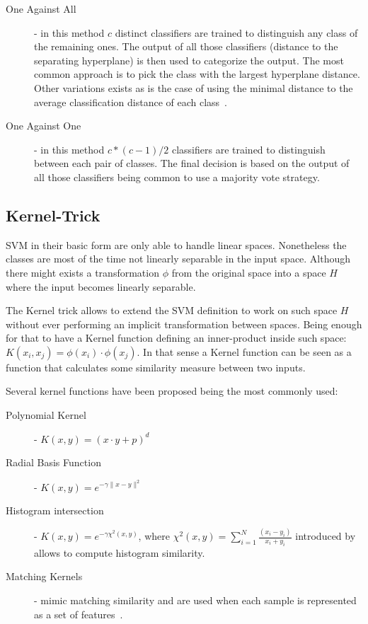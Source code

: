 \begin{description}
\item[One Against All] - in this method $c$ distinct classifiers are trained to
distinguish any class of the remaining ones. The output of all those classifiers
(distance to the separating hyperplane) is then used to categorize the output.
The most common approach is to pick the class with the largest hyperplane
distance. Other variations exists as is the case of using the minimal distance
to the average classification distance of each class~\citep{pronobis2007confidence}.

\item[One Against One] - in this method $c*(c-1)/2$ classifiers are trained to
distinguish between each pair of classes. The final decision is based on the
output of all those classifiers being common to use a majority vote strategy.
\end{description}

\subsection{Kernel-Trick}
\label{sec:kernel-trick}
\gls{SVM} in their basic form are only able to handle linear spaces.
Nonetheless the classes are most of the time not linearly separable in the input
space. Although there might exists a transformation $\phi$ from the original
space into a space $H$ where the input becomes linearly separable.

The Kernel trick allows to extend the \gls{SVM} definition to work on such space
$H$ without ever performing an implicit transformation between spaces. Being
enough for that to have a Kernel function defining an inner-product inside such
space: $K(x_i, x_j) = \phi(x_i)\cdot\phi(x_j)$.
In that sense a Kernel function can be seen as a function that calculates some
similarity measure between two inputs.

Several kernel functions have been proposed being the most commonly used:

\begin{description}
\item[Polynomial Kernel] - $K(x, y) = (x \cdot y + p)^d$
\item[Radial Basis Function] - $K(x, y) = e^{-\gamma\|x - y \|^2}$
\item[Histogram intersection] - $K(x, y) = e^{-\gamma \chi^2(x,y)}$, where
$\chi^2(x,y) = \sum_{i=1}^{N}\frac{(x_i-y_i)}{x_i+y_i}$ introduced by
\cite{barla2003histogram} allows to compute histogram similarity.
\item[Matching Kernels] - mimic matching similarity and are used when each
sample is represented as a set of features~\citep{boughorbel2005intermediate}.
\end{description}

